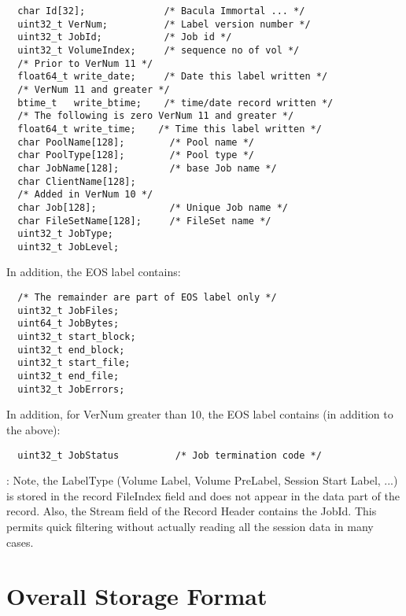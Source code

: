 \footnotesize
\begin{verbatim}
  char Id[32];              /* Bacula Immortal ... */
  uint32_t VerNum;          /* Label version number */
  uint32_t JobId;           /* Job id */
  uint32_t VolumeIndex;     /* sequence no of vol */
  /* Prior to VerNum 11 */
  float64_t write_date;     /* Date this label written */
  /* VerNum 11 and greater */
  btime_t   write_btime;    /* time/date record written */
  /* The following is zero VerNum 11 and greater */
  float64_t write_time;    /* Time this label written */
  char PoolName[128];        /* Pool name */
  char PoolType[128];        /* Pool type */
  char JobName[128];         /* base Job name */
  char ClientName[128];
  /* Added in VerNum 10 */
  char Job[128];             /* Unique Job name */
  char FileSetName[128];     /* FileSet name */
  uint32_t JobType;
  uint32_t JobLevel;
\end{verbatim}
\normalsize

In addition, the EOS label contains: 

\footnotesize
\begin{verbatim}
  /* The remainder are part of EOS label only */
  uint32_t JobFiles;
  uint64_t JobBytes;
  uint32_t start_block;
  uint32_t end_block;
  uint32_t start_file;
  uint32_t end_file;
  uint32_t JobErrors;
\end{verbatim}
\normalsize

In addition, for VerNum greater than 10, the EOS label contains (in addition
to the above): 

\footnotesize
\begin{verbatim}
  uint32_t JobStatus          /* Job termination code */
\end{verbatim}
\normalsize

: Note, the LabelType (Volume Label, Volume PreLabel, Session Start Label,
...) is stored in the record FileIndex field and does not appear in the data
part of the record. Also, the Stream field of the Record Header contains the
JobId. This permits quick filtering without actually reading all the session
data in many cases. 

\section{Overall Storage Format}

